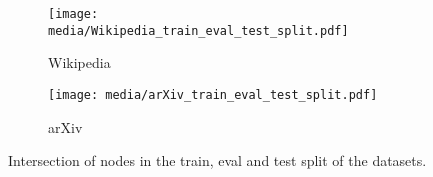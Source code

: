 \begin{figure}
    \centering
    \hspace*{\fill}%
    \begin{subfigure}[t]{0.3\textwidth}
        \centering
        \texttt{[image: media/Wikipedia\_train\_eval\_test\_split.pdf]}
        \caption{Wikipedia}
    \end{subfigure}%
    \hfill
    \begin{subfigure}[t]{0.35\textwidth}
        \centering
        \texttt{[image: media/arXiv\_train\_eval\_test\_split.pdf]}
        \caption{arXiv}
    \end{subfigure}
    \hspace*{\fill}%
    \caption{Intersection of nodes in the train, eval and test split of the datasets.}
    \label{fig:dataset-overlap}
\end{figure}
